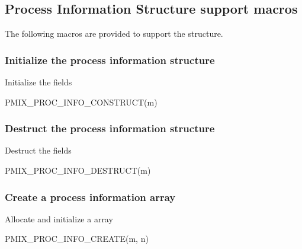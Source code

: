 \subsection{Process Information Structure support macros}

The following macros are provided to support the  structure.

\subsubsection{Initialize the process information structure}

Initialize the  fields

\cspecificstart
\begin{codepar}
PMIX_PROC_INFO_CONSTRUCT(m)
\end{codepar}
\cspecificend

\begin{arglist}
\end{arglist}

\subsubsection{Destruct the process information structure}

Destruct the  fields

\cspecificstart
\begin{codepar}
PMIX_PROC_INFO_DESTRUCT(m)
\end{codepar}
\cspecificend

\begin{arglist}
\end{arglist}

\subsubsection{Create a process information array}

Allocate and initialize a  array

\cspecificstart
\begin{codepar}
PMIX_PROC_INFO_CREATE(m, n)
\end{codepar}
\cspecificend

